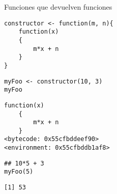 \documentclass[xcolor={usenames,svgnames,dvipsnames}]{beamer}
\begin{document}
\begin{frame}[fragile,label={sec:org7456e09}]{Funciones que devuelven funciones}
 \lstset{language=r,label= ,caption= ,captionpos=b,numbers=none}
\begin{lstlisting}
constructor <- function(m, n){
    function(x)
    {
        m*x + n
    }
}
\end{lstlisting}

\lstset{language=r,label= ,caption= ,captionpos=b,numbers=none}
\begin{lstlisting}
myFoo <- constructor(10, 3)
myFoo
\end{lstlisting}

\begin{verbatim}
function(x)
    {
        m*x + n
    }
<bytecode: 0x55cfbddeef90>
<environment: 0x55cfbddb1af8>
\end{verbatim}

\lstset{language=r,label= ,caption= ,captionpos=b,numbers=none}
\begin{lstlisting}
## 10*5 + 3
myFoo(5)
\end{lstlisting}

\begin{verbatim}
[1] 53
\end{verbatim}
\end{frame}
\end{document}
